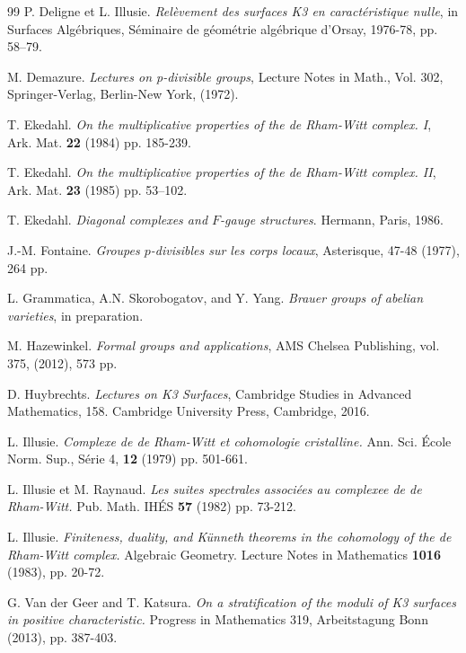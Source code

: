 \documentclass[a4paper,12pt,twoside]{report}
\begin{document}
\begin{thebibliography}{99}
     P. Deligne et L. Illusie. \emph{Relèvement des surfaces K3 en caractéristique nulle}, in Surfaces Alg\'ebriques, Séminaire de géométrie algébrique d'Orsay, 1976-78, pp. 58--79. 

     M. Demazure. \emph{Lectures on p-divisible groups}, Lecture Notes in Math., Vol. 302, Springer-Verlag, Berlin-New York, (1972).

     T. Ekedahl. \emph{On the multiplicative properties of the de Rham-Witt complex. I}, Ark. Mat. {\bf 22} (1984) pp. 185-239. %

     T. Ekedahl. \emph{On the multiplicative properties of the de Rham-Witt complex. II}, Ark. Mat. {\bf 23} (1985) pp. 53–102. %

     T. Ekedahl. \emph{Diagonal complexes and $F$-gauge structures}. Hermann, Paris, 1986.

     J.-M. Fontaine. \emph{Groupes $p$-divisibles sur les corps locaux}, Asterisque, 47-48 (1977), 264 pp. 

     L. Grammatica, A.N. Skorobogatov, and Y. Yang. \emph{Brauer groups of abelian varieties},  in preparation.
    
     M. Hazewinkel. \emph{Formal groups and applications}, AMS Chelsea Publishing, vol. 375, (2012), 573 pp.

     D. Huybrechts. \emph{Lectures on K3 Surfaces}, 
Cambridge Studies in Advanced Mathematics, 158. Cambridge University Press, Cambridge, 2016.

      L. Illusie. \emph{Complexe de de Rham-Witt et cohomologie cristalline.} Ann. Sci. \'Ecole Norm. Sup., S\'erie 4, {\bf 12} (1979) pp. 501-661.
    
      L. Illusie et M. Raynaud. \emph{Les suites spectrales associ\'ees au complexee de de Rham-Witt.} Pub. Math. IH\'ES {\bf 57} (1982) pp. 73-212.
    
     L. Illusie. \emph{Finiteness, duality, and K\"unneth theorems in the cohomology of the de Rham-Witt complex.}  Algebraic Geometry. Lecture Notes in Mathematics {\bf 1016} (1983), pp. 20-72.
    
     G. Van der Geer and T. Katsura. \emph{On a stratification of the moduli of K3 surfaces in positive characteristic.}  Progress in Mathematics 319, Arbeitstagung Bonn (2013), pp. 387-403.


\end{thebibliography}
\end{document}
